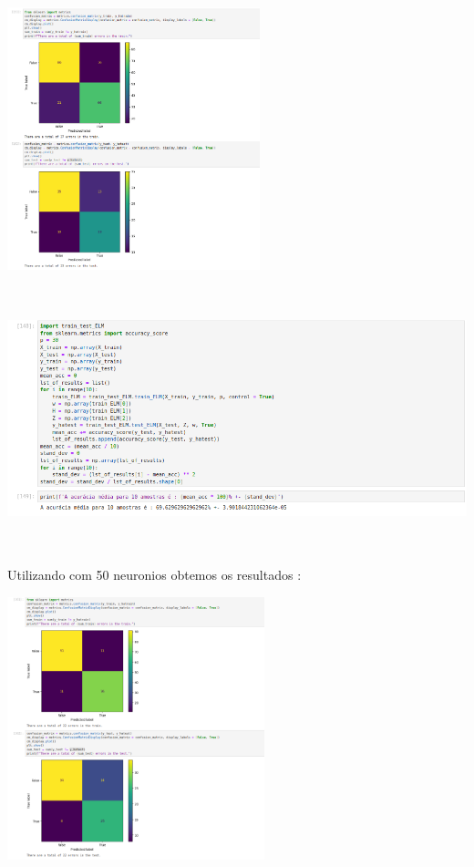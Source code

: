 \documentclass{article}
\begin{document}
\begin{center}
\begin{center}
\includegraphics[height=3in]{Ex6/Hearth_Disease/conf_matrix_health_30.png}
\vspace{10pt}

\end{center}

\begin{center}

\includegraphics[height=3in]{Ex6/Hearth_Disease/acc_30.png}
\vspace{10pt}

\end{center}

\vspace{5pt}
Utilizando com 50 neuronios obtemos os resultados : 

\begin{center}

\includegraphics[height=3in]{Ex6/Hearth_Disease/conf_mat_50.png}
\vspace{10pt}


\end{center}
\end{center}
\end{document}

